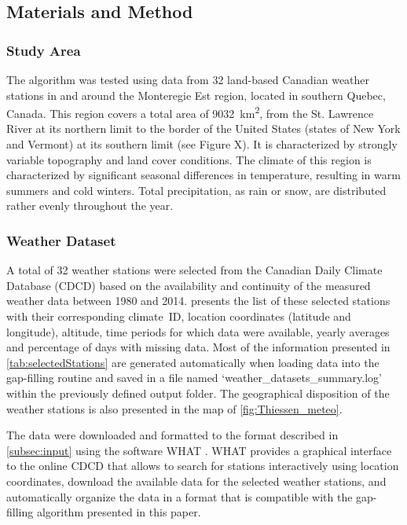 \documentclass[TechnicalNoteMeteo.tex]{subfiles}
\begin{document}
\subsection{Materials and Method}

\subsubsection{Study Area}

The algorithm was tested using data from 32 land-based Canadian weather stations in and around the Monteregie Est region, located in southern Quebec, Canada. This region covers a total area of \SI{9032}{km^2}, from the St. Lawrence River at its northern limit to the border of the United States (states of New York and Vermont) at its southern limit (see Figure X). It is characterized by strongly variable topography and land cover conditions. The climate of this region is characterized by significant seasonal differences in temperature, resulting in warm summers and cold winters. Total precipitation, as rain or snow, are distributed rather evenly throughout the year.

\subsubsection{Weather Dataset}

A total of 32 weather stations were selected from the Canadian Daily Climate Database (CDCD) based on the availability and continuity of the measured weather data between 1980 and 2014.  presents the list of these selected stations with their corresponding climate~ID, location coordinates (latitude and longitude), altitude, time periods for which data were available, yearly averages and percentage of days with missing data. Most of the information presented in \cref{tab:selectedStations} are generated automatically when loading data into the gap-filling routine and saved in a file named `weather\_datasets\_summary.log' within the previously defined output folder. The geographical disposition of the weather stations is also presented in the map of \cref{fig:Thiessen_meteo}.

The data were downloaded and formatted to the format described in \cref{subsec:input} using the software WHAT \citep{gosselin_user_2015}. WHAT provides a graphical interface to the online CDCD that allows to search for stations interactively using location coordinates, download the available data for the selected weather stations, and automatically organize the data in a format that is compatible with the gap-filling algorithm presented in this paper.
\end{document}
